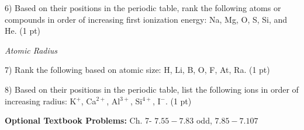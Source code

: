 \documentclass[12pt]{article}
\begin{document}
6) Based on their positions in the periodic table, rank the following atoms or
compounds in order of increasing first ionization energy: Na, Mg, O, S, Si, and
He. (1 pt)
\vspace{0.4in}

\textit{Atomic Radius}

7) Rank the following based on atomic size: H, Li, B, O, F, At, Ra. (1 pt)
\vspace{0.4in}

8) Based on their positions in the periodic table, list the following ions in order
of increasing radius: K$^+$, Ca$^{2+}$, Al$^{3+}$, Si$^{4+}$, I$^-$. (1 pt)

\vfill

\textbf{Optional Textbook Problems:} Ch. 7- $7.55-7.83$ odd, $7.85-7.107$
\end{document}
